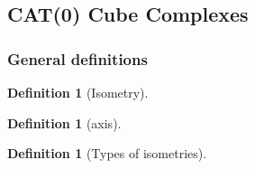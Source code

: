 \documentclass{article}
\theoremstyle{mystyle}
\newtheorem{defn}[thm]{Definition}
\theoremstyle{remark}
\begin{document}





\subsection{CAT(0) Cube Complexes}
\subsubsection {General definitions}
\begin{defn}
    [Isometry]
\end{defn}
\begin{defn}
    [axis]
\end{defn}
\begin{defn}
    [Types of isometries]
\end{defn}
\end{document}
